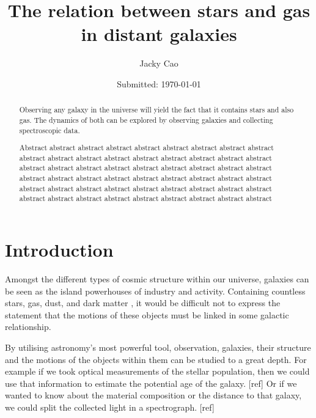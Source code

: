 \documentclass[12pt, twocolumn]{revtex4}    %
\begin{document}
                     


\title{The relation between stars and gas in distant galaxies} 
\date{Submitted: \today{}}
\author{Jacky Cao}

\begin{abstract}              
 
 Observing any galaxy in the universe will yield the fact that it contains stars and also gas. The dynamics of both can be explored by observing galaxies and collecting spectroscopic data. 
 
Abstract abstract abstract abstract abstract abstract abstract abstract abstract abstract abstract abstract abstract abstract abstract abstract abstract abstract abstract abstract abstract abstract abstract abstract abstract abstract abstract abstract abstract abstract abstract abstract abstract abstract abstract abstract abstract abstract abstract abstract abstract abstract abstract abstract abstract abstract abstract abstract abstract abstract abstract abstract abstract abstract 

\end{abstract}


\maketitle

\tableofcontents
\let\toc@pre\relax
\let\toc@post\relax

\newpage

\section{Introduction} 

Amongst the different types of cosmic structure within our universe, galaxies can be seen as the island powerhouses of industry and activity. Containing countless stars, gas, dust, and dark matter \cite{carroll_astro}, it would be difficult not to express the statement that the motions of these objects must be linked in some galactic relationship. 

By utilising astronomy's most powerful tool, observation, galaxies, their structure and the motions of the objects within them can be studied to a great depth. For example if we took optical measurements of the stellar population, then we could use that information to estimate the potential age of the galaxy. [ref] Or if we wanted to know about the material composition or the distance to that galaxy, we could split the collected light in a spectrograph. [ref]
\end{document}
